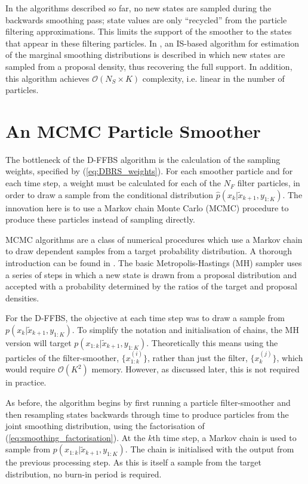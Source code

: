 \documentclass[10pt,twocolumn,twoside]{IEEEtran}
\begin{document}
In the algorithms described so far, no new states are sampled during the backwards smoothing pass; state values are only ``recycled'' from the particle filtering approximations. This limits the support of the smoother to the states that appear in these filtering particles. In \cite{Fearnhead2010}, an IS-based algorithm for estimation of the marginal smoothing distributions is described in which new states are sampled from a proposal density, thus recovering the full support. In addition, this algorithm achieves $\mathcal{O}( N_S \times K)$ complexity, i.e. linear in the number of particles.



\section{An MCMC Particle Smoother} \label{sec:mcmc_smoother}

The bottleneck of the D-FFBS algorithm is the calculation of the sampling weights, specified by (\ref{eq:DBRS_weights}). For each smoother particle and for each time step, a weight must be calculated for each of the $N_F$ filter particles, in order to draw a sample from the conditional distribution $\hat{p}(x_k|\tilde{x}_{k+1}, y_{1:K})$. The innovation here is to use a Markov chain Monte Carlo (MCMC) procedure to produce these particles instead of sampling directly.

MCMC algorithms are a class of numerical procedures which use a Markov chain to draw dependent samples from a target probability distribution. A thorough introduction can be found in \cite{Gilks1996}. The basic Metropolis-Hastings (MH) \cite{Hastings1970} sampler uses a series of steps in which a new state is drawn from a proposal distribution and accepted with a probability determined by the ratios of the target and proposal densities.

For the D-FFBS, the objective at each time step was to draw a sample from $p(x_{k}|\tilde{x}_{k+1}, y_{1:K})$. To simplify the notation and initialisation of chains, the MH version will target $p(x_{1:k}|\tilde{x}_{k+1}, y_{1:K})$. Theoretically this means using the particles of the filter-smoother, $\{x_{1:k}^{(i)}\}$, rather than just the filter, $\{x_k^{(j)}\}$, which would require $\mathcal{O}(K^2)$ memory. However, as discussed later, this is not required in practice.

As before, the algorithm begins by first running a particle filter-smoother and then resampling states backwards through time to produce particles from the joint smoothing distribution, using the factorisation of (\ref{eq:smoothing_factorisation}). At the $k$th time step, a Markov chain is used to sample from $p(x_{1:k}|\tilde{x}_{k+1}, y_{1:K})$. The chain is initialised with the output from the previous processing step. As this is itself a sample from the target distribution, no burn-in period is required.
\end{document}
